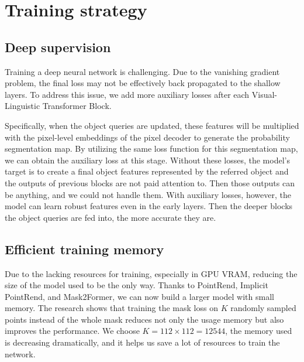 \section{Training strategy}
\label{sec:rvos_training_strategy}
\subsection{Deep supervision}
Training a deep neural network is challenging. Due to the vanishing gradient problem, the final loss may not be effectively back propagated to the shallow layers. To address this issue, we add more auxiliary losses after each Visual-Linguistic Transformer Block.

Specifically, when the object queries are updated, these features will be multiplied with the pixel-level embeddings of the pixel decoder to generate the probability segmentation map. By utilizing the same loss function for this segmentation map, we can obtain the auxiliary loss at this stage. Without these losses, the model's target is to create a final object features represented by the referred object and the outputs of previous blocks are not paid attention to. Then those outputs can be anything, and we could not handle them. With auxiliary losses, however, the model can learn robust features even in the early layers. Then the deeper blocks the object queries are fed into, the more accurate they are. 


\subsection{Efficient training memory}

Due to the lacking resources for training, especially in GPU VRAM, reducing the size of the model used to be the only way. Thanks to PointRend, Implicit PointRend, and Mask2Former, we can now build a larger model with small memory. The research shows that training the mask loss on $K$ randomly sampled points instead of the whole mask reduces not only the usage memory but also improves the performance. 
We choose $K = 112 \times 112 = 12544$, the memory used is decreasing dramatically, and it helps us save a lot of resources to train the network.







